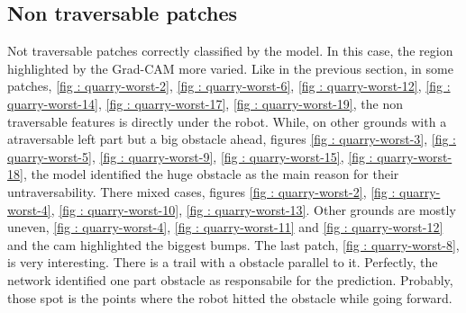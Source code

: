 \documentclass[../document.tex]{subfiles}
\begin{document}
\subsection{Non traversable patches}
    Not traversable patches correctly classified by the model. In this case, the region highlighted by the Grad-CAM more varied. Like in the previous section, in some patches, \ref{fig : quarry-worst-2}, \ref{fig : quarry-worst-6}, \ref{fig : quarry-worst-12}, \ref{fig : quarry-worst-14}, \ref{fig : quarry-worst-17}, \ref{fig : quarry-worst-19}, the non traversable features is directly under the robot. While, on other grounds with a atraversable left part but a big obstacle ahead, figures \ref{fig : quarry-worst-3}, \ref{fig : quarry-worst-5}, \ref{fig : quarry-worst-9}, \ref{fig : quarry-worst-15}, \ref{fig : quarry-worst-18}, the model identified the huge obstacle as the main reason for their untraversability. There mixed cases, figures \ref{fig : quarry-worst-2}, \ref{fig : quarry-worst-4}, \ref{fig : quarry-worst-10}, \ref{fig : quarry-worst-13}. Other grounds are mostly uneven, \ref{fig : quarry-worst-4}, \ref{fig : quarry-worst-11} and \ref{fig : quarry-worst-12} and the cam highlighted the biggest bumps. The last patch, \ref{fig : quarry-worst-8}, is very interesting. There is a trail with a obstacle parallel to it. Perfectly, the network identified one part obstacle as responsabile for the prediction. Probably, those spot is the points where the robot hitted the obstacle while going forward.
\end{document}
